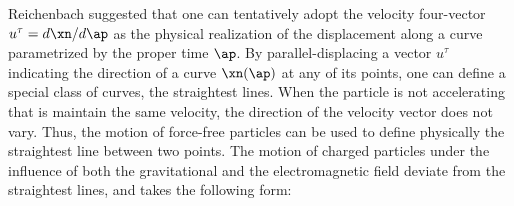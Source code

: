 {Reichenbach suggested that one can tentatively adopt the velocity four-vector $u^\tau=d\xn/d\ap$ as the physical realization of the displacement \citep[]{Eddington1923} along a curve parametrized by the proper time $\ap$. By parallel-displacing a vector $u^\tau$ indicating the direction of a curve $\xn(\ap)$ at any of its points, one can define a special class of curves, the straightest lines. When the particle is not accelerating that is maintain the same velocity, the direction of the velocity vector does not vary. Thus, the motion of force-free particles can be used to define physically the straightest line between two \spti points. The motion of charged particles under the influence of both the gravitational and the electromagnetic field deviate from the straightest lines, and takes the following form:
%
%
%  
}
